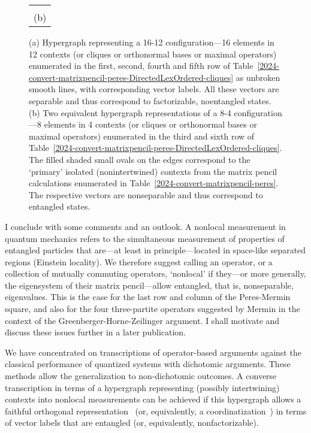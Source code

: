 \documentclass[
  twocolumn,
 showpacs,
 showkeys,
 preprintnumbers,
 amsmath,amssymb,
 aps,
 prl,
  longbibliography,
 floatfix,
 ]{revtex4-2}
\begin{document}
\begin{figure}
\begin{center}
\begin{tabular}{c}
{\begin{tikzpicture}  [scale=0.7]
    \end{tikzpicture}
}
\\
(b)
\\
\end{tabular}
\end{center}
\caption{\label{2024-convert-f-16-12}
(a)
Hypergraph representing a 16-12 configuration---16 elements in 12 contexts (or cliques or orthonormal bases or maximal operators)
enumerated in the first, second, fourth and fifth row of
Table~\ref{2024-convert-matrixpencil-peres-DirectedLexOrdered-cliques}
as unbroken smooth lines, with corresponding vector labels.
All these vectors are separable and thus correspond to factorizable, noentangled states.
(b)
Two equivalent hypergraph representations of a 8-4 configuration---8 elements in 4 contexts (or cliques or orthonormal bases or maximal operators)
enumerated in the third and sixth row of
Table~\ref{2024-convert-matrixpencil-peres-DirectedLexOrdered-cliques}.
The filled shaded small ovals on the edges correspond to the `primary' isolated (nonintertwined) contexts from the matrix pencil calculations enumerated
in Table~\ref{2024-convert-matrixpencil-peres}.
The respective vectors are nonseparable and thus correspond to entangled states.
}
\end{figure}



I conclude with some comments and an outlook.
A nonlocal measurement in quantum mechanics refers to the simultaneous measurement of properties of entangled particles that are---at least in principle---located in space-like separated regions (Einstein locality).
We therefore suggest calling an operator, or a collection of mutually commuting operators, `nonlocal' if they---or more generally, the eigensystem of their matrix pencil---allow entangled, that is, nonseparable, eigenvalues.
This is the case for the last row and column of the Peres-Mermin square, and also for the four three-partite operators suggested by Mermin in the context of the Greenberger-Horne-Zeilinger argument.
I shall motivate and discuss these issues further in a later publication.

We have concentrated on transcriptions of operator-based arguments against the classical performance of quantized systems with dichotomic arguments.
These methods allow the generalization to non-dichotomic outcomes.
A converse transcription in terms of a hypergraph representing (possibly intertwining) contexts into nonlocal measurements can be achieved if this hypergraph allows a faithful orthogonal representation~\cite{lovasz-79,Portillo-2015}
(or, equivalently, a coordinatization~\cite{Pavii2018}) in terms of vector labels that are entangled (or, equivalently, nonfactorizable).
\end{document}
